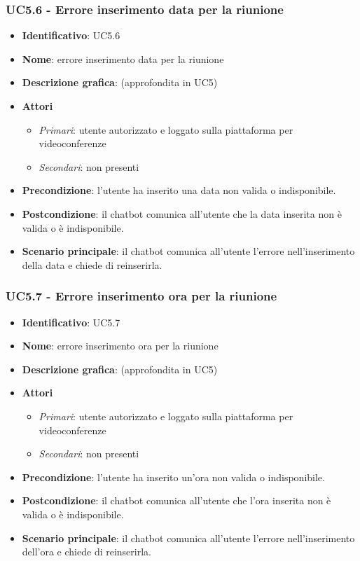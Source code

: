 \subsubsection{UC5.6 - Errore inserimento data per la riunione}
\begin{itemize}
    \item \textbf{Identificativo}: UC5.6
    \item \textbf{Nome}: errore inserimento data per la riunione
    \item \textbf{Descrizione grafica}: (approfondita in UC5)
    \item \textbf{Attori}
 \begin{itemize} 
    \item \textit{Primari}: utente autorizzato e loggato sulla piattaforma per videoconferenze
    \item \textit{Secondari}: non presenti
 \end{itemize}
 \item \textbf{Precondizione}: l'utente ha inserito una data non valida o indisponibile.
 \item \textbf{Postcondizione}: il chatbot comunica all'utente che la data inserita non è valida o è indisponibile.
 \item \textbf{Scenario principale}: il chatbot comunica all'utente l'errore nell'inserimento della data e chiede di reinserirla.
\end{itemize}
\subsubsection{UC5.7 - Errore inserimento ora per la riunione}
\begin{itemize}
    \item \textbf{Identificativo}: UC5.7
    \item \textbf{Nome}: errore inserimento ora per la riunione
    \item \textbf{Descrizione grafica}: (approfondita in UC5)
    \item \textbf{Attori}
 \begin{itemize} 
    \item \textit{Primari}: utente autorizzato e loggato sulla piattaforma per videoconferenze
    \item \textit{Secondari}: non presenti
 \end{itemize}
 \item \textbf{Precondizione}: l'utente ha inserito un'ora non valida o indisponibile.
 \item \textbf{Postcondizione}: il chatbot comunica all'utente che l'ora inserita non è valida o è indisponibile.
 \item \textbf{Scenario principale}: il chatbot comunica all'utente l'errore nell'inserimento dell'ora e chiede di reinserirla.
\end{itemize}
